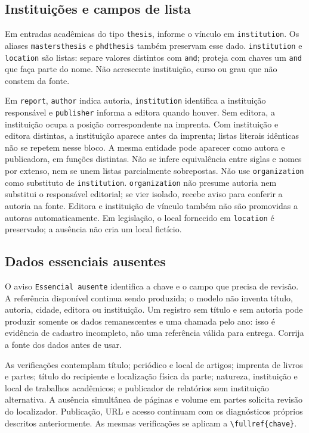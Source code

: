 \subsection*{Instituições e campos de lista}

Em entradas acadêmicas do tipo \texttt{thesis}, informe o vínculo em
\texttt{institution}. Os aliases \texttt{mastersthesis} e \texttt{phdthesis}
também preservam esse dado. \texttt{institution} e \texttt{location} são listas:
separe valores distintos com \texttt{and}; proteja com chaves um \texttt{and}
que faça parte do nome. Não acrescente instituição, curso ou grau que não
constem da fonte.

Em \texttt{report}, \texttt{author} indica autoria, \texttt{institution}
identifica a instituição responsável e \texttt{publisher} informa a editora
quando houver. Sem editora, a instituição ocupa a posição correspondente na
imprenta. Com instituição e editora distintas, a instituição aparece antes
da imprenta; listas literais idênticas não se repetem nesse bloco. A mesma
entidade pode aparecer como autora e publicadora, em funções distintas.
Não se infere equivalência entre siglas e nomes por extenso, nem se unem
listas parcialmente sobrepostas. Não use \texttt{organization} como substituto
de \texttt{institution}. \texttt{organization} não presume autoria nem
substitui o responsável editorial; se vier isolado, recebe aviso para
conferir a autoria na fonte. Editora e instituição de vínculo também
não são promovidas a autoras automaticamente.
Em legislação, o local fornecido em
\texttt{location} é preservado; a ausência não cria um local fictício.

\subsection*{Dados essenciais ausentes}

O aviso \texttt{Essencial ausente} identifica a chave e o campo que precisa
de revisão. A referência disponível continua sendo produzida; o modelo
não inventa título, autoria, cidade, editora ou instituição. Um registro
sem título e sem autoria pode produzir somente os dados remanescentes e
uma chamada pelo ano: isso é evidência de cadastro incompleto, não uma
referência válida para entrega. Corrija a fonte dos dados antes de usar.

As verificações contemplam título; periódico e local de artigos; imprenta
de livros e partes; título do recipiente e localização física da parte;
natureza, instituição e local de trabalhos acadêmicos; e publicador de
relatórios sem instituição alternativa. A ausência simultânea de páginas
e volume em partes solicita revisão do localizador. Publicação, URL e
acesso continuam com os diagnósticos próprios descritos anteriormente.
As mesmas verificações se aplicam a \verb|\fullref{chave}|.

